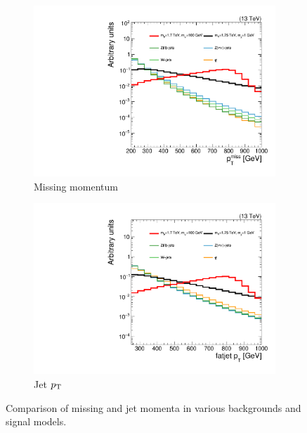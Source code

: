 \begin{figure}[!ht]
    \begin{center}
        \begin{subfigure}[t]{0.49\textwidth}
            \includegraphics[width=\textwidth]{figures/monotop/shapes/signal_pfmet_logy.pdf}
            \caption{Missing momentum}
        \end{subfigure}
        \begin{subfigure}[t]{0.49\textwidth}
            \includegraphics[width=\textwidth]{figures/monotop/shapes/signal_fjPt_0__logy.pdf}
            \caption{Jet $p_\mathrm{T}$}
        \end{subfigure}
        \caption{Comparison of missing and jet momenta in various backgrounds and signal models.}
        \label{fig:mt:bkgshapes}
    \end{center}
\end{figure}

